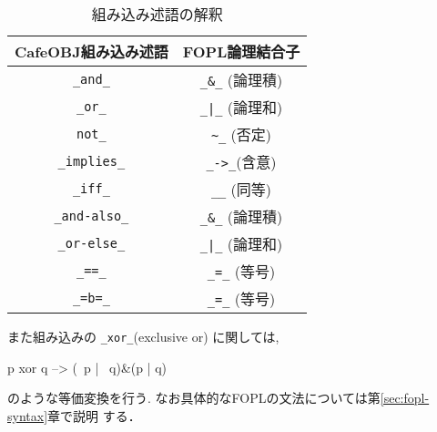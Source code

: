 \begin{table}[htbp]
  \begin{center}
    \begin{tabular}{c|c}\hline
      \multicolumn{1}{G|}{CafeOBJ組み込み述語} &
      \multicolumn{1}{G}{FOPL論理結合子}\\\hline
    \texttt{\_and\_} &                 \texttt{\_\&\_} (論理積) \\\hline
    \texttt{\_or\_} &                   \verb^_|_^ (論理和) \\\hline
    \texttt{not\_} &                  \verb|~|{\texttt\_} (否定) \\\hline
    \texttt{\_implies\_}  &            \texttt{\_->\_}(含意) \\\hline
    \texttt{\_iff\_}      &            \texttt{\_<->\_} (同等) \\\hline
    \texttt{\_and-also\_} &            \texttt{\_\&\_} (論理積) \\\hline
    \texttt{\_or-else\_} &             \verb^_|_^ (論理和) \\\hline
    \texttt{\_==\_}      &             \texttt{\_=\_} (等号) \\\hline
    \texttt{\_=b=\_}     &             \texttt{\_=\_} (等号) \\\hline
    \end{tabular}
    \caption{{組み込み述語の解釈}}
    \label{tab:builtin-pred}
  \end{center}
\end{table}

また組み込みの \texttt{\_xor\_}(exclusive or) に関しては,

\begin{vvtm}
\begin{simplev}
    p xor q --> (~p | ~q)&(p | q)
\end{simplev}
\end{vvtm}

のような等価変換を行う.
なお具体的なFOPLの文法については第\ref{sec:fopl-syntax}章で説明
する．


